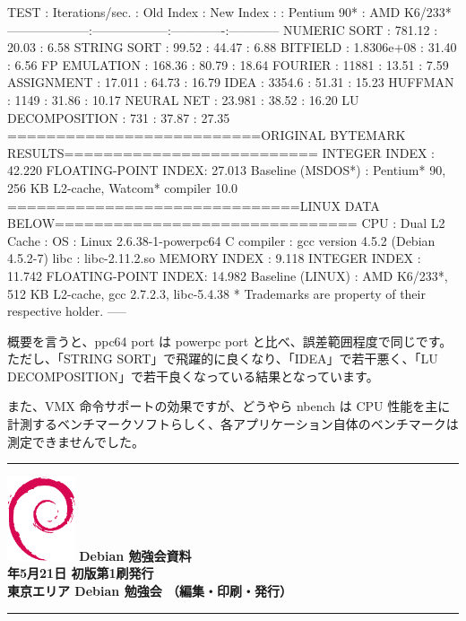 \documentclass[mingoth,a4paper]{jsarticle}
\newcommand{\debmtgyear}{2011}
\newcommand{\debmtgmonth}{5}
\newcommand{\debmtgdate}{21}
\begin{document}
\begin{commandline}
TEST                : Iterations/sec.  : Old Index   : New Index
                    :                  : Pentium 90* : AMD K6/233*
--------------------:------------------:-------------:------------
NUMERIC SORT        :          781.12  :      20.03  :       6.58
STRING SORT         :           99.52  :      44.47  :       6.88
BITFIELD            :      1.8306e+08  :      31.40  :       6.56
FP EMULATION        :          168.36  :      80.79  :      18.64
FOURIER             :           11881  :      13.51  :       7.59
ASSIGNMENT          :          17.011  :      64.73  :      16.79
IDEA                :          3354.6  :      51.31  :      15.23
HUFFMAN             :            1149  :      31.86  :      10.17
NEURAL NET          :          23.981  :      38.52  :      16.20
LU DECOMPOSITION    :             731  :      37.87  :      27.35
==========================ORIGINAL BYTEMARK RESULTS==========================
INTEGER INDEX       : 42.220
FLOATING-POINT INDEX: 27.013
Baseline (MSDOS*)   : Pentium* 90, 256 KB L2-cache, Watcom* compiler 10.0
==============================LINUX DATA BELOW===============================
CPU                 : Dual
L2 Cache            : 
OS                  : Linux 2.6.38-1-powerpc64
C compiler          : gcc version 4.5.2 (Debian 4.5.2-7) 
libc                : libc-2.11.2.so
MEMORY INDEX        : 9.118
INTEGER INDEX       : 11.742
FLOATING-POINT INDEX: 14.982
Baseline (LINUX)    : AMD K6/233*, 512 KB L2-cache, gcc 2.7.2.3, libc-5.4.38
* Trademarks are property of their respective holder.
-----
\end{commandline}

概要を言うと、ppc64 port は powerpc port と比べ、誤差範囲程度で同じです。
ただし、「STRING SORT」で飛躍的に良くなり、「IDEA」で若干悪く、「LU DECOMPOSITION」で若干良くなっている結果となっています。

また、VMX 命令サポートの効果ですが、どうやら nbench は CPU 性能を主に計測するベンチマークソフトらしく、各アプリケーション自体のベンチマークは測定できませんでした。

\printindex

\cleartooddpage

\vspace*{15cm}
\hrule
\vspace{2mm}
\includegraphics[width=2cm]{image200502/openlogo-nd.eps}
\noindent \Large \bf Debian 勉強会資料\\
\noindent \normalfont \debmtgyear{}年\debmtgmonth{}月\debmtgdate{}日 \hspace{5mm}  初版第1刷発行\\
\noindent \normalfont 東京エリア Debian 勉強会 （編集・印刷・発行）\\
\hrule
\end{document}
